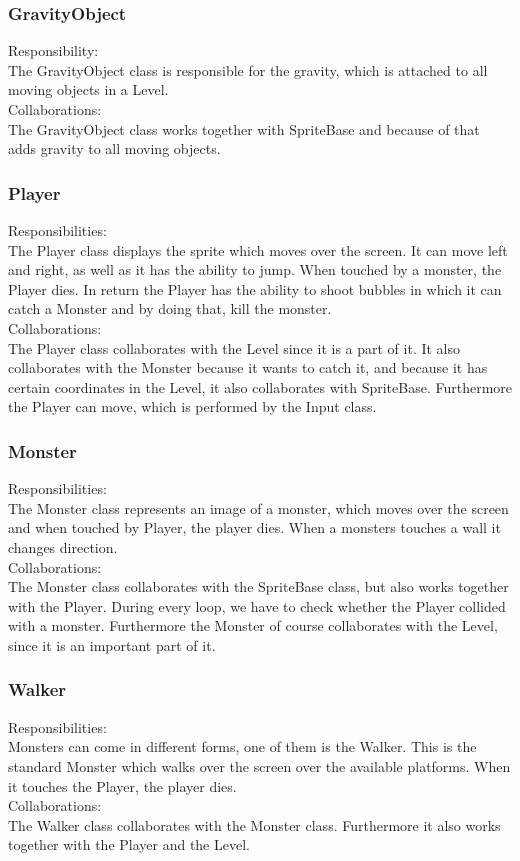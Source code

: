 \subsubsection{GravityObject}
Responsibility: \\
The GravityObject class is responsible for the gravity, which is attached to all moving objects in a Level. \\
Collaborations: \\
The GravityObject class works together with SpriteBase and because of that adds gravity to all moving objects. 

\subsubsection{Player}
Responsibilities: \\
The Player class displays the sprite which moves over the screen. It can move left and right, as well as it has the ability to jump. When touched by a monster, the Player dies. In return the Player has the ability to shoot bubbles in which it can catch a Monster and by doing that, kill the monster. \\
Collaborations: \\
The Player class collaborates with the Level since it is a part of it. It also collaborates with the Monster because it wants to catch it, and because it has certain coordinates in the Level, it also collaborates with SpriteBase. Furthermore the Player can move, which is performed by the Input class. 

\subsubsection{Monster}
Responsibilities: \\
The Monster class represents an image of a monster, which moves over the screen and when touched by Player, the player dies. When a monsters touches a wall it changes direction. \\
Collaborations: \\
The Monster class collaborates with the SpriteBase class, but also works together with the Player. During every loop, we have to check whether the Player collided with a monster. Furthermore the Monster of course collaborates with the Level, since it is an important part of it. 

\subsubsection{Walker}
Responsibilities: \\
Monsters can come in different forms, one of them is the Walker. This is the standard Monster which walks over the screen over the available platforms. When it touches the Player, the player dies. \\
Collaborations: \\
The Walker class collaborates with the Monster class. Furthermore it also works together with the Player and the Level. 

